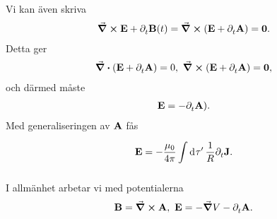 Vi kan även skriva
\begin{align*}
	\curl{\vb{E}} + \partial_{t}^{}\vb{B}(t) = \curl(\vb{E} + \partial_{t}^{}\vb{A}) = \vb{0}.
\end{align*}
Detta ger
\begin{align*}
	\div(\vb{E} + \partial_{t}^{}\vb{A}) = 0,\ \curl(\vb{E} + \partial_{t}^{}\vb{A}) = \vb{0},
\end{align*}
och därmed måste
\begin{align*}
	\vb{E} = -\partial_{t}^{}\vb{A}).
\end{align*}
Med generaliseringen av $\vb{A}$ fås
\begin{align*}
	\vb{E} = -\frac{\mu_{0}}{4\pi}\int\limits_{}^{}\dd[]{\tau'}\frac{1}{R}\partial_{t}^{}\vb{J}.
\end{align*}

I allmänhet arbetar vi med potentialerna
\begin{align*}
	\vb{B} = \curl{\vb{A}},\ \vb{E} = -\grad{V} - \partial_{t}^{}\vb{A}.
\end{align*}